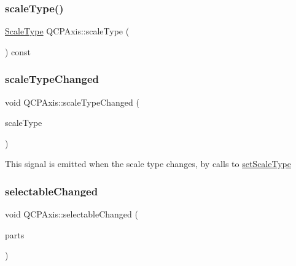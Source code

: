 \subsubsection{\texorpdfstring{scaleType()}{scaleType()}}
{\footnotesize\ttfamily \mbox{\hyperlink{class_q_c_p_axis_a36d8e8658dbaa179bf2aeb973db2d6f0}{Scale\+Type}} Q\+C\+P\+Axis\+::scale\+Type (\begin{DoxyParamCaption}{ }\end{DoxyParamCaption}) const\hspace{0.3cm}{\ttfamily [inline]}}

\mbox{\label{class_q_c_p_axis_a3505ed8a93bd2e349d858d84996bf767}} 
\subsubsection{\texorpdfstring{scaleTypeChanged}{scaleTypeChanged}}
{\footnotesize\ttfamily void Q\+C\+P\+Axis\+::scale\+Type\+Changed (\begin{DoxyParamCaption}\item[{\mbox{\hyperlink{class_q_c_p_axis_a36d8e8658dbaa179bf2aeb973db2d6f0}{Q\+C\+P\+Axis\+::\+Scale\+Type}}}]{scale\+Type }\end{DoxyParamCaption})\hspace{0.3cm}{\ttfamily [signal]}}

This signal is emitted when the scale type changes, by calls to \mbox{\hyperlink{class_q_c_p_axis_adef29cae617af4f519f6c40d1a866ca6}{set\+Scale\+Type}} \mbox{\label{class_q_c_p_axis_aa5ff1fd851139028a3bb4efcb31de9fc}} 
\subsubsection{\texorpdfstring{selectableChanged}{selectableChanged}}
{\footnotesize\ttfamily void Q\+C\+P\+Axis\+::selectable\+Changed (\begin{DoxyParamCaption}\item[{const Q\+C\+P\+Axis\+::\+Selectable\+Parts \&}]{parts }\end{DoxyParamCaption})\hspace{0.3cm}{\ttfamily [signal]}}

